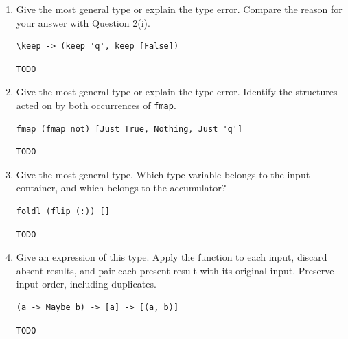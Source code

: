 \documentclass[11pt]{article}
\begin{document}
\begin{enumerate}
\item
\begin{minipage}[t]{\linewidth}
Give the most general type or explain the type error. Compare
the reason for your answer with Question 2(i).
\begin{lstlisting}
\keep -> (keep 'q', keep [False])
\end{lstlisting}
\begin{lstlisting}[style=answer]
TODO

\end{lstlisting}
\end{minipage}

\item
\begin{minipage}[t]{\linewidth}
Give the most general type or explain the type error. Identify
the structures acted on by both occurrences of \texttt{fmap}.
\begin{lstlisting}
fmap (fmap not) [Just True, Nothing, Just 'q']
\end{lstlisting}
\begin{lstlisting}[style=answer]
TODO

\end{lstlisting}
\end{minipage}

\item
\begin{minipage}[t]{\linewidth}
Give the most general type. Which type variable belongs to the
input container, and which belongs to the accumulator?
\begin{lstlisting}
foldl (flip (:)) []
\end{lstlisting}
\begin{lstlisting}[style=answer]
TODO

\end{lstlisting}
\end{minipage}

\item
\begin{minipage}[t]{\linewidth}
Give an expression of this type. Apply the function to each
input, discard absent results, and pair each present result with its
original input. Preserve input order, including duplicates.
\begin{lstlisting}
(a -> Maybe b) -> [a] -> [(a, b)]
\end{lstlisting}
\begin{lstlisting}[style=answer]
TODO



\end{lstlisting}
\end{minipage}

\end{enumerate}
\end{document}
